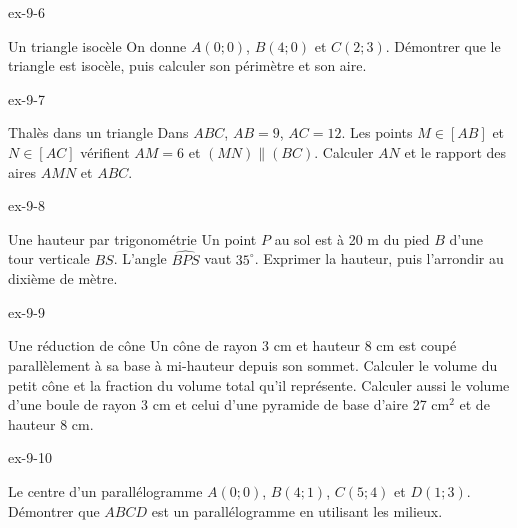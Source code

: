 \clearpage{}
\begin{blocLivre}{ex-9-6}
\begin{exercice}[2]{Un triangle isocèle}
On donne $A(0;0)$, $B(4;0)$ et $C(2;3)$. Démontrer que le triangle est isocèle, puis calculer son périmètre et son aire.
\label{fig-ex-9-6}
\end{exercice}
\end{blocLivre}
\begin{blocLivre}{ex-9-7}
\begin{exercice}[2]{Thalès dans un triangle}
Dans $ABC$, $AB=9$, $AC=12$. Les points $M\in[AB]$ et $N\in[AC]$ vérifient $AM=6$ et $(MN)\parallel(BC)$. Calculer $AN$ et le rapport des aires $AMN$ et $ABC$.
\label{fig-ex-9-7}
\end{exercice}
\end{blocLivre}
\begin{blocLivre}{ex-9-8}
\begin{exercice}[2]{Une hauteur par trigonométrie}
Un point $P$ au sol est à 20 m du pied $B$ d’une tour verticale $BS$. L’angle $\widehat{BPS}$ vaut $35^\circ$. Exprimer la hauteur, puis l’arrondir au dixième de mètre.
\label{fig-ex-9-8}
\end{exercice}
\end{blocLivre}
\begin{blocLivre}{ex-9-9}
\begin{exercice}[2]{Une réduction de cône}
Un cône de rayon 3 cm et hauteur 8 cm est coupé parallèlement à sa base à mi-hauteur depuis son sommet. Calculer le volume du petit cône et la fraction du volume total qu’il représente. Calculer aussi le volume d’une boule de rayon 3 cm et celui d’une pyramide de base d’aire 27 cm$^2$ et de hauteur 8 cm.
\label{fig-ex-9-9}
\end{exercice}
\end{blocLivre}
\begin{blocLivre}{ex-9-10}
\begin{exercice}[2]{Le centre d’un parallélogramme}
$A(0;0)$, $B(4;1)$, $C(5;4)$ et $D(1;3)$. Démontrer que $ABCD$ est un parallélogramme en utilisant les milieux.
\label{fig-ex-9-10}
\end{exercice}
\end{blocLivre}

